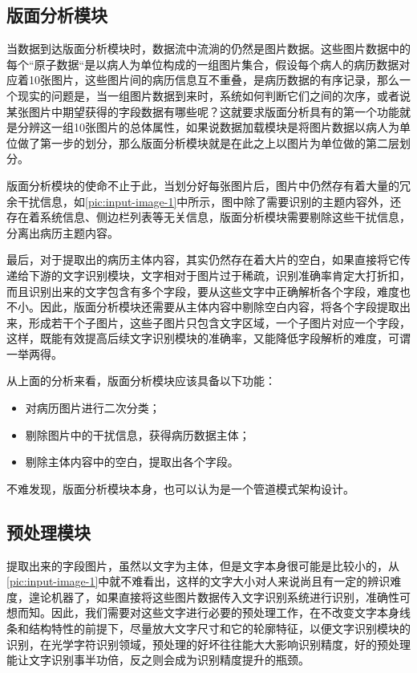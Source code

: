 \subsection{版面分析模块} \label{ssec:framework-segmentation-analysis}
当数据到达版面分析模块时，数据流中流淌的仍然是图片数据。这些图片数据中的每个“原子数据“是以病人为单位构成的一组图片集合，假设每个病人的病历数据对应着10张图片，这些图片间的病历信息互不重叠，是病历数据的有序记录，那么一个现实的问题是，当一组图片数据到来时，系统如何判断它们之间的次序，或者说某张图片中期望获得的字段数据有哪些呢？这就要求版面分析具有的第一个功能就是分辨这一组10张图片的总体属性，如果说数据加载模块是将图片数据以病人为单位做了第一步的划分，那么版面分析模块就是在此之上以图片为单位做的第二层划分。

版面分析模块的使命不止于此，当划分好每张图片后，图片中仍然存有着大量的冗余干扰信息，如\autoref{pic:input-image-1}中所示，图中除了需要识别的主题内容外，还存在着系统信息、侧边栏列表等无关信息，版面分析模块需要剔除这些干扰信息，分离出病历主题内容。

最后，对于提取出的病历主体内容，其实仍然存在着大片的空白，如果直接将它传递给下游的文字识别模块，文字相对于图片过于稀疏，识别准确率肯定大打折扣，而且识别出来的文字包含有多个字段，要从这些文字中正确解析各个字段，难度也不小。因此，版面分析模块还需要从主体内容中剔除空白内容，将各个字段提取出来，形成若干个子图片，这些子图片只包含文字区域，一个子图片对应一个字段，这样，既能有效提高后续文字识别模块的准确率，又能降低字段解析的难度，可谓一举两得。

从上面的分析来看，版面分析模块应该具备以下功能：
\begin{itemize}
	\item 对病历图片进行二次分类；
	\item 剔除图片中的干扰信息，获得病历数据主体；
	\item 剔除主体内容中的空白，提取出各个字段。
\end{itemize}
不难发现，版面分析模块本身，也可以认为是一个管道模式架构设计。

\subsection{预处理模块}
提取出来的字段图片，虽然以文字为主体，但是文字本身很可能是比较小的，从\autoref{pic:input-image-1}中就不难看出，这样的文字大小对人来说尚且有一定的辨识难度，遑论机器了，如果直接将这些图片数据传入文字识别系统进行识别，准确性可想而知。因此，我们需要对这些文字进行必要的预处理工作，在不改变文字本身线条和结构特性的前提下，尽量放大文字尺寸和它的轮廓特征，以便文字识别模块的识别，在光学字符识别领域，预处理的好坏往往能大大影响识别精度，好的预处理能让文字识别事半功倍，反之则会成为识别精度提升的瓶颈。

